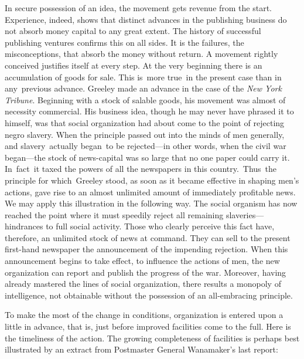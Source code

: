 \documentclass[openany,nobib]{tufte-book}
\begin{document}
In secure possession of an idea, the movement gets revenue from the
start. Experience, indeed, shows that distinct advances in the
publishing business do not absorb money capital to any great extent. The
history of successful publishing ventures confirms this on all sides. It
is the failures, the misconceptions, that absorb the money without
return. A movement rightly conceived justifies itself at every step. At
the very beginning there is an accumulation of goods for sale. This
is~more true~in the present case than in any~previous advance. Greeley
made an advance in the case of the \emph{New York Tribune}. Beginning
with a stock of salable goods, his movement was almost of necessity
commercial. His business idea, though he may never have phrased it to
himself, was that social organization had about come to the point of
rejecting negro slavery. When the principle passed out into the minds of
men generally, and slavery~actually began~to be rejected---in other
words, when the civil war began---the stock of news-capital was so large
that no one paper could carry it. In~fact~it taxed the powers of all the
newspapers in this country.~Thus~the principle for which~Greeley stood,
as soon as it became effective in shaping men's actions, gave rise to an
almost unlimited amount of immediately profitable news. We may apply
this illustration in the following way. The social organism has now
reached the point where it must speedily reject all remaining
slaveries---hindrances to full social activity. Those who clearly
perceive this fact have, therefore, an unlimited stock of news at
command. They can sell to the present first-hand newspaper the
announcement of the impending rejection. When this announcement begins
to take effect, to influence the actions of men, the new organization
can report and publish the progress of the war. Moreover, having already
mastered the lines of social organization, there results a monopoly of
intelligence, not obtainable without the possession of an all-embracing
principle.~

To make the most of the change in conditions, organization is entered
upon a little in advance, that is, just before improved facilities come
to the full. Here is the timeliness of the action. The growing
completeness of facilities is perhaps best illustrated by an extract
from Postmaster General Wanamaker's last report:
\end{document}
